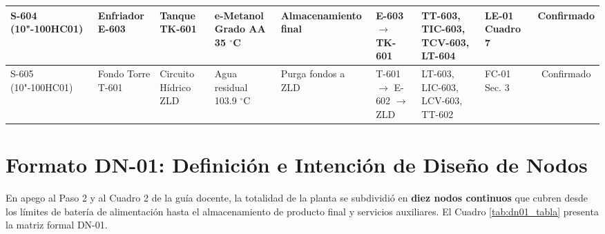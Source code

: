 \documentclass[10pt,letterpaper]{article}
\begin{document}
\begin{landscape}
\begin{xltabular}{\linewidth}{|p{2.4cm}|p{1.8cm}|p{1.8cm}|p{1.8cm}|p{1.6cm}|p{2.2cm}|>{\raggedright\arraybackslash}X|p{1.8cm}|c|}
S-604 (10"-100HC01) & Enfriador E-603 & Tanque TK-601 & e-Metanol Grado AA 35 $^\circ$C & Almacenamiento final & E-603 $\to$ TK-601 & TT-603, TIC-603, TCV-603, LT-604 & LE-01 Cuadro 7 & Confirmado \\ \hline
S-605 (10"-100HC01) & Fondo Torre T-601 & Circuito Hídrico ZLD & Agua residual 103.9 $^\circ$C & Purga fondos a ZLD & T-601 $\to$ E-602 $\to$ ZLD & LT-603, LIC-603, LCV-603, TT-602 & FC-01 Sec. 3 & Confirmado \\ \hline
\end{xltabular}
\end{landscape}

\section{Formato DN-01: Definición e Intención de Diseño de Nodos}
En apego al Paso 2 y al Cuadro 2 de la guía docente, la totalidad de la planta se subdividió en \textbf{diez nodos continuos} que cubren desde los límites de batería de alimentación hasta el almacenamiento de producto final y servicios auxiliares. El Cuadro \ref{tab:dn01_tabla} presenta la matriz formal DN-01.
\end{document}
